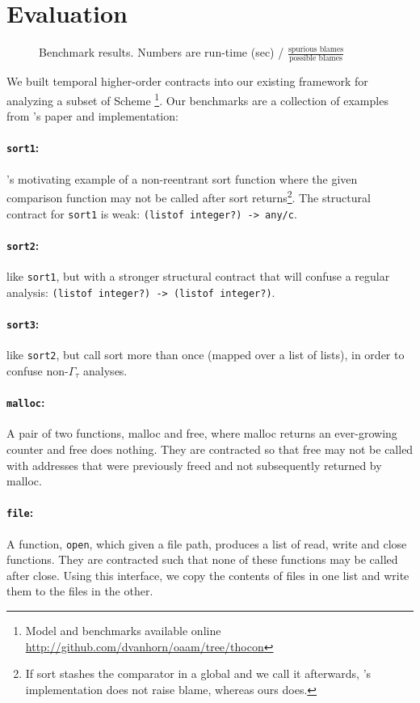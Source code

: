 \section{Evaluation}

\begin{figure}
  
  \caption{Benchmark results. Numbers are run-time (sec) / $\frac{\text{spurious blames}}{\text{possible blames}}$}
  \label{fig:evaluation}
\end{figure}
We built temporal higher-order contracts into our existing framework for analyzing a subset of Scheme \footnote{Model and benchmarks available online \url{http://github.com/dvanhorn/oaam/tree/thocon}}.
%
Our benchmarks are a collection of examples from \dfm's paper and implementation:
\paragraph{{\tt sort1}:}{\dfm's motivating example of a non-reentrant sort function where the given comparison function may not be called after sort returns\footnote{If sort stashes the comparator in a global and we call it afterwards, \dfm's implementation does not raise blame, whereas ours does.}.
%
The structural contract for {\tt sort1} is weak: {\tt (listof integer?) -> any/c}.
}
\paragraph{{\tt sort2}:}{like {\tt sort1}, but with a stronger structural contract that will confuse a regular analysis: {\tt (listof integer?) -> (listof integer?)}.}
\paragraph{{\tt sort3}:}{like {\tt sort2}, but call sort more than once (mapped over a list of lists), in order to confuse non-$\Gamma_\tau$ analyses.}
\paragraph{{\tt malloc}:}{A pair of two functions, malloc and free, where malloc returns an ever-growing counter and free does nothing. They are contracted so that free may not be called with addresses that were previously freed and not subsequently returned by malloc.}
\paragraph{{\tt file}:}{A function, {\tt open}, which given a file path, produces a list of read, write and close functions. They are contracted such that none of these functions may be called after close. Using this interface, we copy the contents of files in one list and write them to the files in the other.}

